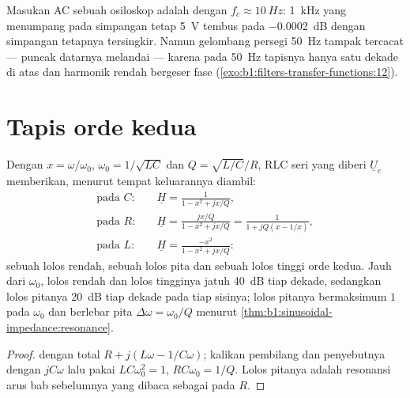 \begin{example}[Gandengan AC]\label{ex:b1:filters-transfer-functions:accoupling}
Masukan AC sebuah osiloskop adalah  dengan
$f_c \approx \qty{10}{Hz}$:  \qty{1}{kHz} yang menumpang pada
simpangan tetap \qty{5}{V} tembus pada \qty{-0.0002}{dB} dengan
simpangan tetapnya tersingkir. Namun gelombang persegi \qty{50}{Hz}
tampak tercacat --- puncak datarnya melandai --- karena pada
\qty{50}{Hz} tapisnya hanya satu dekade di atas  dan
harmonik rendah  bergeser fase
(\cref{exo:b1:filters-transfer-functions:12}).
\end{example}

\section{Tapis orde kedua}

\begin{proposition}\label{prop:b1:filters-transfer-functions:rlc}
Dengan $x = \omega/\omega_0$, $\omega_0 = 1/\sqrt{LC}$ dan $Q =
\sqrt{L/C}/R$, RLC seri yang diberi $\underline U_e$ memberikan, menurut
tempat keluarannya diambil:
\begin{align*}
\text{pada } C:&\quad \underline H = \frac{1}{1 - x^2 + jx/Q}, \\
\text{pada } R:&\quad \underline H = \frac{jx/Q}{1 - x^2 + jx/Q} = \frac{1}{1 + jQ(x - 1/x)}, \\
\text{pada } L:&\quad \underline H = \frac{-x^2}{1 - x^2 + jx/Q}:
\end{align*}
sebuah lolos rendah, sebuah lolos pita dan sebuah lolos tinggi orde
kedua. Jauh dari $\omega_0$, lolos rendah dan lolos tingginya jatuh
\qty{40}{dB} tiap dekade, sedangkan lolos pitanya \qty{20}{dB} tiap
dekade pada tiap sisinya; lolos pitanya bermaksimum $1$ pada $\omega_0$
dan berlebar pita $\Delta\omega =
\omega_0/Q$ menurut \cref{thm:b1:sinusoidal-impedance:resonance}.
\end{proposition}

\begin{proof}
 dengan  total $R + j(L\omega - 1/C\omega)$;
kalikan pembilang dan penyebutnya dengan $jC\omega$ lalu pakai
$LC\omega_0^2 = 1$, $RC\omega_0 = 1/Q$. Lolos pitanya adalah resonansi
arus bab sebelumnya yang dibaca sebagai  pada $R$.
\end{proof}

